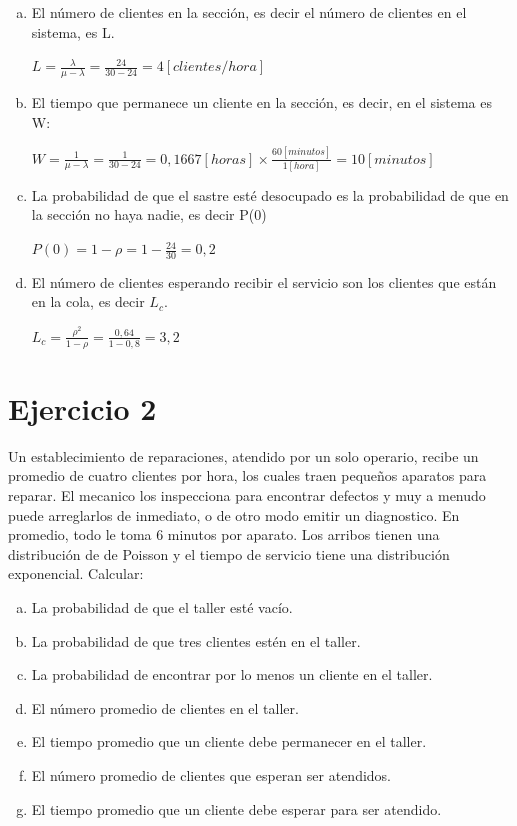 \documentclass[a4paper,11pt]{article}
\begin{document}
\begin{enumerate}[a)]
  \vspace{13pt}
  \item El número de clientes en la sección, es decir el número de clientes en
    el sistema, es L.

  $L = \frac{\lambda}{\mu - \lambda} = \frac{24}{30 - 24} = 4 [clientes/hora]$

  \vspace{13pt}
  \item El tiempo que permanece un cliente en la sección, es decir, en el
    sistema es W:

  $W = \frac{1}{\mu-\lambda} = \frac{1}{30-24} = 0,1667[horas] \times \frac{60[minutos]}{1[hora]} = 10[minutos]$

  \vspace{13pt}
  \item La probabilidad de que el sastre esté desocupado es la probabilidad de
    que en la sección no haya nadie, es decir P(0)

  $P(0) = 1-\rho = 1-\frac{24}{30} = 0,2$

  \vspace{13pt}
  \item El número de clientes esperando recibir el servicio son los clientes
    que están en la cola, es decir $L_c$.

  $L_c = \frac{\rho^2}{1-\rho} = \frac{0,64}{1-0,8} = 3,2$

\end{enumerate}
\vspace{35pt}
\section*{\textbf{Ejercicio 2}}

Un establecimiento de reparaciones, atendido por un solo operario, recibe un
promedio de cuatro clientes por hora, los cuales traen pequeños aparatos para
reparar.  El mecanico los inspecciona para encontrar defectos y muy a menudo
puede arreglarlos de inmediato, o de otro modo emitir un diagnostico. En
promedio, todo le toma 6 minutos por aparato. Los arribos tienen una
distribución de de Poisson y el tiempo de servicio tiene una distribución
exponencial. Calcular:

\leftskip=36pt
\parindent=-18pt
\begin{enumerate}[a)]
  \item La probabilidad de que el taller esté vacío.
  \item La probabilidad de que tres clientes estén en el taller.
  \item La probabilidad de encontrar por lo menos un cliente en el taller.
  \item El número promedio de clientes en el taller.
  \item El tiempo promedio que un cliente debe permanecer en el taller.
  \item El número promedio de clientes que esperan ser atendidos.
  \item El tiempo promedio que un cliente debe esperar para ser atendido.
\end{enumerate}
\end{document}
